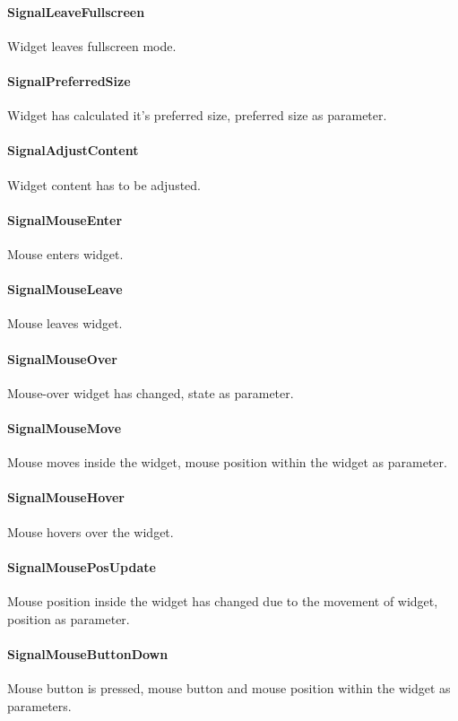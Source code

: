 \paragraph{SignalLeaveFullscreen}
Widget leaves fullscreen mode.

\paragraph{SignalPreferredSize}
Widget has calculated it's preferred size, preferred size as parameter.

\paragraph{SignalAdjustContent}
Widget content has to be adjusted.

\paragraph{SignalMouseEnter}
Mouse enters widget.

\paragraph{SignalMouseLeave}
Mouse leaves widget.

\paragraph{SignalMouseOver}
Mouse-over widget has changed, state as parameter.

\paragraph{SignalMouseMove}
Mouse moves inside the widget, mouse position within the widget as parameter.

\paragraph{SignalMouseHover}
Mouse hovers over the widget.

\paragraph{SignalMousePosUpdate}
Mouse position inside the widget has changed due to the movement of widget, position as parameter.

\paragraph{SignalMouseButtonDown}
Mouse button is pressed, mouse button and mouse position within the widget as parameters.

